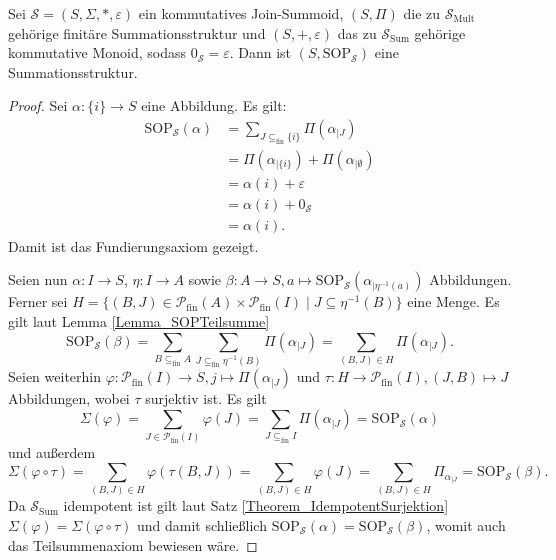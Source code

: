 \documentclass{article}
\begin{document}
\begin{theorem}
  Sei $\mathcal{S} = (S, \Sigma, \ast, \varepsilon)$ ein kommutatives Join-Summoid,
  $(S, \Pi)$ die zu $\mathcal{S}_\text{Mult}$ gehörige finitäre Summationsstruktur
  und $(S, +, \varepsilon)$ das zu $\mathcal{S}_\text{Sum}$ gehörige kommutative Monoid,
  sodass $0_\mathcal{S} = \varepsilon$.
  Dann ist $(S, \text{SOP}_\mathcal{S})$ eine Summationsstruktur.
\end{theorem}
\begin{proof}
  Sei $\alpha \colon \{i\} \to S$ eine Abbildung.
  Es gilt:
  \begin{align*}
    \text{SOP}_\mathcal{S}(\alpha) &= \sum_{J \subseteq_{\text{fin}} \{i\}}\Pi(\alpha_{\mid J}) \\
    &= \Pi(\alpha_{\mid \{i\}}) + \Pi(\alpha_{\mid \emptyset}) \\
    &= \alpha(i) + \varepsilon \\
    &= \alpha(i) + 0_\mathcal{S} \\
    &= \alpha(i).
  \end{align*}
  Damit ist das Fundierungsaxiom gezeigt. 
  
  Seien nun $\alpha \colon I \to S$,
  $\eta \colon I \to A$
  sowie $\beta \colon A \to S, a \mapsto \text{SOP}_\mathcal{S}(\alpha_{\mid \eta^{-1}(a)})$ Abbildungen.
  Ferner sei $H = \{(B, J) \in \mathcal{P}_\text{fin}(A) \times \mathcal{P}_\text{fin}(I) \mid J \subseteq \eta^{-1}(B)\}$ eine Menge.
  Es gilt laut Lemma \ref{Lemma_SOPTeilsumme}
  \begin{equation*}
    \text{SOP}_\mathcal{S}(\beta) 
    = \sum_{B \subseteq_\text{fin} A}\sum_{J \subseteq_\text{fin} \eta^{-1}(B)}\Pi(\alpha_{\mid J})
    = \sum_{(B, J) \in H} \Pi(\alpha_{\mid J}).
  \end{equation*}
  Seien weiterhin $\varphi \colon \mathcal{P}_\text{fin}(I) \to S, j \mapsto \Pi(\alpha_{\mid J})$
  und $\tau \colon H \to \mathcal{P}_\text{fin}(I), (J, B) \mapsto J$ Abbildungen,
  wobei $\tau$ surjektiv ist.
  Es gilt
  \begin{equation*}
    \Sigma(\varphi)
    = \sum_{J \in \mathcal{P}_\text{fin}(I)} \varphi(J)
    = \sum_{J \subseteq_\text{fin} I} \Pi(\alpha_{\mid J})
    = \text{SOP}_\mathcal{S}(\alpha)
  \end{equation*}
  und außerdem
  \begin{equation*}
    \Sigma(\varphi \circ \tau)
    = \sum_{(B, J) \in H} \varphi(\tau(B, J))
    = \sum_{(B, J) \in H} \varphi(J)
    = \sum_{(B, J) \in H} \Pi_{\alpha_{\mid J}}
    = \text{SOP}_\mathcal{S}(\beta).
  \end{equation*}
  Da $\mathcal{S}_\text{Sum}$ idempotent ist gilt laut Satz \ref{Theorem_IdempotentSurjektion} $\Sigma(\varphi) = \Sigma(\varphi \circ \tau)$
  und damit schließlich $\text{SOP}_\mathcal{S}(\alpha) = \text{SOP}_\mathcal{S}(\beta)$,
  womit auch das Teilsummenaxiom bewiesen wäre.
\end{proof}
\end{document}
